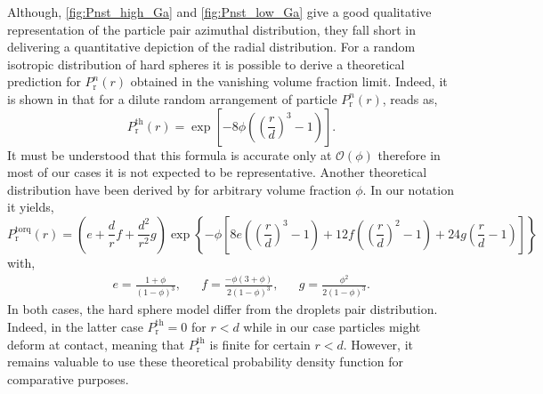 Although, \ref{fig:Pnst_high_Ga} and \ref{fig:Pnst_low_Ga} give a good qualitative representation of the particle pair azimuthal distribution, they fall short in delivering a quantitative depiction of the radial distribution.
For a random isotropic distribution of hard spheres it is possible to derive a theoretical prediction for $P_\text{r}^n(r)$ obtained in the vanishing volume fraction limit. 
Indeed, it is shown in \citet{zhang2021ensemble} that for a dilute random arrangement of particle $P_\text{r}^n(r)$, reads as, 
\begin{equation}
    P_\text{r}^\text{th}(r) = \exp\left[- 8\phi\left(\left(\frac{r}{d}\right)^3-1\right)\right].
    \label{eq:Pnst_dilute}
\end{equation}
It must be understood that this formula is accurate only at $\mathcal{O}(\phi)$ therefore in most of our cases it is not expected to be representative.
Another theoretical distribution have been derived by \citet{torquato1990nearest} for arbitrary volume fraction $\phi$. 
In our notation it yields, 
\begin{equation}
    P_\text{r}^\text{torq}(r) = 
        \left(e+\frac{d}{r}f +\frac{d^2}{r^2}g\right)
    \exp\left\{-\phi\left[8e\left(\left(\frac{r}{d}\right)^3-1\right)+12 f\left(\left(\frac{r}{d}\right)^2-1\right)+24g\left(\frac{r}{d}-1\right)\right]\right\}
    \label{eq:torquato}
\end{equation}
with, 
\begin{align*}
    && e= \frac{1+\phi}{(1-\phi)^3},
    && f= \frac{-\phi (3+\phi)}{2(1-\phi)^3},
    && g= \frac{\phi^2}{2(1-\phi)^3}.
\end{align*}
In both cases, the hard sphere model differ from the droplets pair distribution.
Indeed, in the latter case $P_\text{r}^\text{th} = 0$ for $r<d$ while in our case particles might deform at contact, meaning that $P_\text{r}^\text{th}$ is finite for certain $r<d$. 
However, it remains valuable to use these theoretical probability density function for comparative purposes. 

